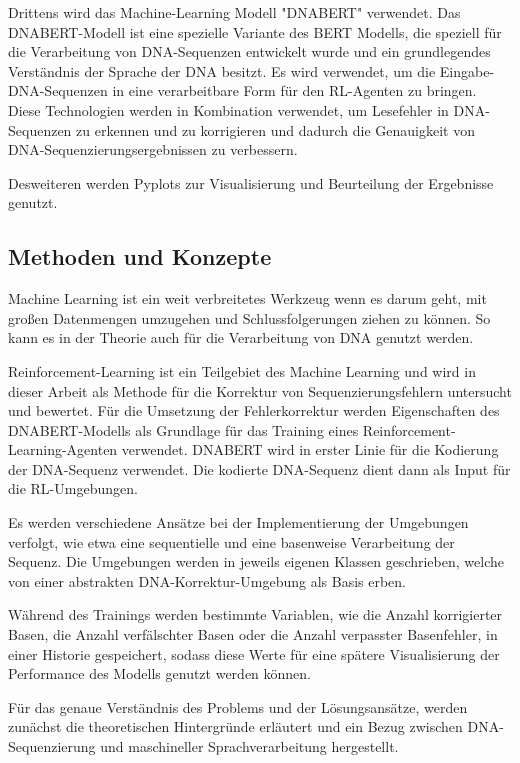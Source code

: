 \documentclass[oneside,bibliography=totocnumbered,BCOR=5mm]{scrbook}%
\theoremstyle{definition}
\theoremstyle{definition}
\theoremstyle{definition}
\theoremstyle{definition}
\theoremstyle{definition}
\theoremstyle{definition}
\begin{document}
Drittens wird das Machine-Learning Modell "DNABERT" verwendet.
Das DNABERT-Modell ist eine spezielle Variante des BERT Modells, 
die speziell für die Verarbeitung von DNA-Sequenzen entwickelt wurde und 
ein grundlegendes Verständnis der Sprache der DNA besitzt. 
Es wird verwendet, um die Eingabe-DNA-Sequenzen in eine verarbeitbare Form für den RL-Agenten zu bringen.
Diese Technologien werden in Kombination verwendet, um Lesefehler in DNA-Sequenzen zu erkennen und zu korrigieren 
und dadurch die Genauigkeit von DNA-Sequenzierungsergebnissen zu verbessern.

Desweiteren werden Pyplots zur Visualisierung und Beurteilung der Ergebnisse genutzt.


\subsection{Methoden und Konzepte}
Machine Learning ist ein weit verbreitetes Werkzeug wenn es darum geht, 
mit großen Datenmengen umzugehen und Schlussfolgerungen ziehen zu können. 
So kann es in der Theorie auch für die Verarbeitung von DNA genutzt werden.


Reinforcement-Learning ist ein Teilgebiet des Machine Learning und wird in dieser Arbeit als Methode für 
die Korrektur von Sequenzierungsfehlern untersucht und bewertet.
Für die Umsetzung der Fehlerkorrektur werden Eigenschaften des DNABERT-Modells als Grundlage für das Training eines
Reinforcement-Learning-Agenten verwendet. DNABERT wird in erster Linie für die Kodierung der
DNA-Sequenz verwendet. Die kodierte DNA-Sequenz dient dann als Input für die RL-Umgebungen.


Es werden verschiedene Ansätze bei der Implementierung der Umgebungen verfolgt, 
wie etwa eine sequentielle und eine basenweise Verarbeitung der Sequenz. 
Die Umgebungen werden in jeweils eigenen Klassen geschrieben, welche von einer abstrakten
DNA-Korrektur-Umgebung als Basis erben. 


Während des Trainings werden bestimmte Variablen, wie die Anzahl korrigierter Basen, die Anzahl
verfälschter Basen oder die Anzahl verpasster Basenfehler, in einer Historie gespeichert, 
sodass diese Werte für eine spätere Visualisierung der Performance des Modells genutzt werden können.


Für das genaue Verständnis des Problems und der Lösungsansätze, 
werden zunächst die theoretischen Hintergründe erläutert und ein Bezug zwischen DNA-Sequenzierung und maschineller Sprachverarbeitung hergestellt.
\end{document}
